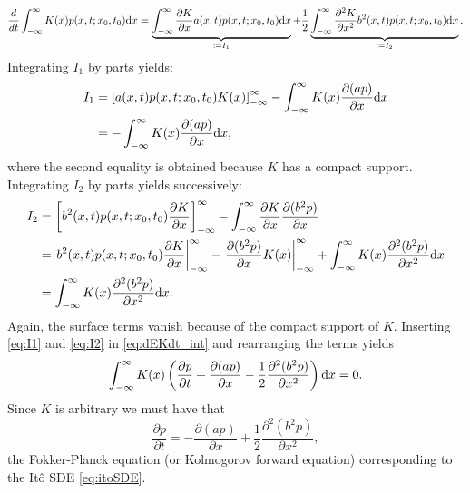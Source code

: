 \begin{equation} \label{eq:dEKdt_int}
	\frac{d}{dt} \int_{-\infty}^{\infty} K(x) p(x,t;x_0,t_0) \rm dx = \underbrace{\int_{-\infty}^{\infty} \frac{\partial K}{\partial x} a(x,t) p(x,t;x_0,t_0) \rm dx}_{:= I_1} + \frac{1}{2} \underbrace{\int_{-\infty}^{\infty} \frac{\partial^2 K}{\partial x^2} b^2(x,t) p(x,t;x_0,t_0) \rm dx}_{:= I_2}.
\end{equation}
Integrating $I_1$ by parts yields:
\begin{align}
	I_1 &= \left[ a(x,t)p(x,t;x_0,t_0)K(x)\right]_{-\infty}^{\infty} - \int_{-\infty}^{\infty} K(x) \frac{\partial{(ap)}}{\partial x} \rm dx \nonumber\\
	&= - \int_{-\infty}^{\infty} K(x) \frac{\partial{(ap)}}{\partial x} \rm dx, \label{eq:I1}
\end{align}
where the second equality is obtained because $K$ has a compact support. Integrating $I_2$ by parts yields successively:
\begin{align}
	I_2 &= 	\left[ b^2(x,t) p(x,t;x_0,t_0) \frac{\partial K}{\partial x} \right]_{-\infty}^{\infty} - \int_{-\infty}^{\infty} \frac{\partial K}{\partial x} \frac{\partial (b^2 p)}{\partial x} \nonumber\\
	&= \left. b^2(x,t) p(x,t;x_0,t_0) \frac{\partial K}{\partial x} \right|_{-\infty}^{\infty} - \left. \frac{\partial (b^2 p)}{\partial x} K(x) \right|_{-\infty}^{\infty} +  \int_{-\infty}^{\infty} K(x) \frac{\partial^2 (b^2 p)}{\partial x^2} \rm dx\nonumber\\
	&= \int_{-\infty}^{\infty} K(x) \frac{\partial^2 (b^2 p)}{\partial x^2} \rm dx. \label{eq:I2}
\end{align}
Again, the surface terms vanish because of the compact support of $K$. Inserting \eqref{eq:I1} and \eqref{eq:I2} in \eqref{eq:dEKdt_int} and rearranging the terms yields
\begin{equation}
	\int_{-\infty}^{\infty} K(x) \left( \frac{\partial p}{\partial t} + \frac{\partial (ap)}{\partial x} - \frac{1}{2}\frac{\partial^2 (b^2 p)}{\partial x^2}\right) \rm dx= 0.
\end{equation}
Since $K$ is arbitrary we must have that
\begin{equation} \label{eq:FPito}
	\frac{\partial p}{\partial t} = - \frac{\partial (ap)}{\partial x} + \frac{1}{2}\frac{\partial^2 (b^2 p)}{\partial x^2},
\end{equation}
the Fokker-Planck equation (or Kolmogorov forward equation) corresponding to the Itô SDE \eqref{eq:itoSDE}.

